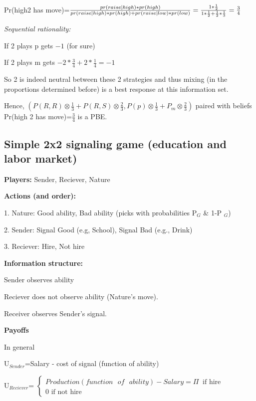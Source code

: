 \documentclass{article}
\begin{document}
Pr(high\TEXTsymbol{\vert}2 has move)=$\frac{pr(raise|high)\ast pr(high)}{%
pr(raise|high)\ast pr(high)+pr(raise|low)\ast pr(low)}=\frac{1\ast \frac{1}{2%
}}{1\ast \frac{1}{2}+\frac{1}{2}\ast \frac{1}{3}}=\allowbreak \frac{3}{4}$

\textit{Sequential rationality:\ }

If 2 plays p gets $-1$ (for sure)

If 2 plays m gets $-2\ast \frac{3}{4}+2\ast \frac{1}{4}=\allowbreak -1$

\bigskip 

So 2 is indeed neutral between these 2 strategies and thus mixing (in the
proportions determined before) is a best response at this information set.

\bigskip 

Hence, $(P(R,R)\otimes \frac{1}{3}+P(R,S)\otimes \frac{2}{3},P(p)\otimes 
\frac{1}{3}+P_{m}\otimes \frac{2}{3})$ paired with beliefs Pr(high%
\TEXTsymbol{\vert}2 has move)=$\frac{3}{4}$ is a PBE.

\bigskip 

\bigskip 

\subsection{Simple 2x2 signaling game (education and labor market)}

\textbf{Players: }Sender, Reciever, Nature

\bigskip

\textbf{Actions (and order):}

1. Nature: Good ability, Bad ability (picks with probabilities P$_{G}$ \& 1-P%
$_{G}$)

2. Sender: Signal Good (e.g, School), Signal Bad (e.g., Drink)

3. Reciever: Hire, Not hire

\bigskip

\textbf{Information structure:}

Sender observes ability

Reciever does not observe ability (Nature's move).

Receiver observes Sender's signal.

\bigskip

\textbf{Payoffs}

In general

U$_{Sender}$=Salary - cost of signal (function of ability)

U$_{Reciever}$= $\left\{ 
\begin{array}{c}
Production(function\text{ }of\text{ }ability)-Salary=\Pi \ \text{\ if hire}
\\ 
0\text{ if not hire}%
\end{array}%
\right. $
\end{document}
